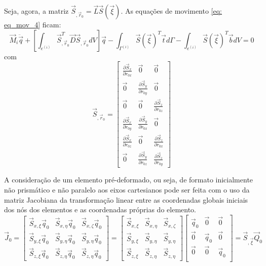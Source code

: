 Seja, agora, a matriz $\vec{S}_{,\vec{r}_0} = \vec{L}\vec{S}(\vec{\xi})$. As equações de movimento \eqref{eq: eq_mov_4} ficam:
\begin{equation}
     \vec{M}_i \ddot{\vec{q}} + 
    \left[ \int_{e^{(i)}}{ \vec{S}_{,\vec{r}_0}^T \vec{D} \vec{S}_{,\vec{r}_0}  dV}\right]\vec{q}
    - \int_{\Gamma^{(i)}}{\vec{S}(\vec{\xi})^T \vec{t} d\Gamma} 
    - \int_{e^{(i)}}{\vec{S}(\vec{\xi})^T \vec{b} dV} = 0  \label{eq: eq_mov_quase_final}
\end{equation}
com
\begin{equation}
    \vec{S}_{,\vec{r}_0} = \begin{bmatrix}
        \frac{\partial \vec{S}_x}{\partial r_{0x}} & \vec{0} & \vec{0} \\
        \vec{0} & \frac{\partial \vec{S}_y}{\partial r_{0y}} & \vec{0} \\
        \vec{0} & \vec{0} & \frac{\partial \vec{S}_z}{\partial r_{0z}} \\
        \frac{\partial \vec{S}_x}{\partial r_{0y}} & \frac{\partial \vec{S}_y}{\partial r_{0x}} & \vec{0} \\
        \frac{\partial \vec{S}_x}{\partial r_{0z}} & \vec{0} & \frac{\partial \vec{S}_z}{\partial r_{0x}} \\
        \vec{0} & \frac{\partial \vec{S}_y}{\partial r_{0z}} & \frac{\partial \vec{S}_z}{\partial r_{0y}}
    \end{bmatrix} \label{eq: matriz_B}
\end{equation}


A consideração de um elemento pré-deformado, ou seja, de formato inicialmente não prismático e não paralelo aos eixos cartesianos 
pode ser feita 
com o uso da matriz Jacobiana da transformação linear entre as coordenadas globais iniciais dos nós dos elementos e as coordenadas 
próprias do elemento.
\begin{equation} \vec{J}_0 = \begin{bmatrix} 
        \vec{S}_{x,\xi}\vec{q}_0 & \vec{S}_{x,\eta}\vec{q}_0 & \vec{S}_{x,\zeta}\vec{q}_0 \\
        \vec{S}_{y,\xi}\vec{q}_0 & \vec{S}_{y,\eta}\vec{q}_0 & \vec{S}_{y,\eta}\vec{q}_0 \\
        \vec{S}_{z,\xi}\vec{q}_0 & \vec{S}_{z,\eta}\vec{q}_0 & \vec{S}_{z,\eta}\vec{q}_0
\end{bmatrix} =  \begin{bmatrix} 
        \vec{S}_{x,\xi} & \vec{S}_{x,\eta} & \vec{S}_{x,\zeta} \\
        \vec{S}_{y,\xi} & \vec{S}_{y,\eta} & \vec{S}_{y,\eta} \\
        \vec{S}_{z,\xi} & \vec{S}_{z,\eta} & \vec{S}_{z,\eta}
\end{bmatrix} \begin{bmatrix}
    \vec{q}_0 & \vec{0} & \vec{0} \\
    \vec{0}& \vec{q}_0 & \vec{0} \\
    \vec{0} & \vec{0} & \vec{q}_0 \\
\end{bmatrix} = \vec{S}_{,\vec{\xi}}\vec{Q}_0\label{eq:jaco_0_3D} \end{equation}

